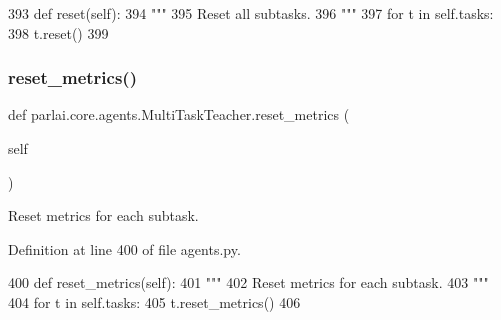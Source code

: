 \begin{DoxyCode}
393     \textcolor{keyword}{def }reset(self):
394         \textcolor{stringliteral}{"""}
395 \textcolor{stringliteral}{        Reset all subtasks.}
396 \textcolor{stringliteral}{        """}
397         \textcolor{keywordflow}{for} t \textcolor{keywordflow}{in} self.tasks:
398             t.reset()
399 
\end{DoxyCode}
\mbox{\label{classparlai_1_1core_1_1agents_1_1MultiTaskTeacher_a78eb3c163a158deda3bb6bd9000fcee2}} 
\subsubsection{\texorpdfstring{reset\+\_\+metrics()}{reset\_metrics()}}
{\footnotesize\ttfamily def parlai.\+core.\+agents.\+Multi\+Task\+Teacher.\+reset\+\_\+metrics (\begin{DoxyParamCaption}\item[{}]{self }\end{DoxyParamCaption})}

\begin{DoxyVerb}Reset metrics for each subtask.
\end{DoxyVerb}
 

Definition at line 400 of file agents.\+py.


\begin{DoxyCode}
400     \textcolor{keyword}{def }reset\_metrics(self):
401         \textcolor{stringliteral}{"""}
402 \textcolor{stringliteral}{        Reset metrics for each subtask.}
403 \textcolor{stringliteral}{        """}
404         \textcolor{keywordflow}{for} t \textcolor{keywordflow}{in} self.tasks:
405             t.reset\_metrics()
406 
\end{DoxyCode}
\mbox{\label{classparlai_1_1core_1_1agents_1_1MultiTaskTeacher_abb082dd4c5be92b7ce7683b16d0abd2c}} 
